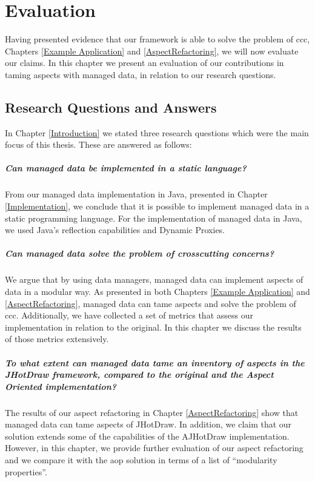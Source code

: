 
\chapter{Evaluation}\label{Evaluation}

Having presented evidence that our framework is able to solve the problem of \ac{ccc}, Chapters \ref{Example Application} and \ref{AspectRefactoring}, we will now evaluate our claims.
In this chapter we present an evaluation of our contributions in taming aspects with managed data, in relation to our research questions.

\section{Research Questions and Answers}\label{Research Questions and Answers}
In Chapter \ref{Introduction} we stated three research questions which were the main focus of this thesis.
These are answered as follows:

\paragraph{Can managed data be implemented in a static language?}
From our managed data implementation in Java, presented in Chapter \ref{Implementation}, we conclude that it is possible to implement managed data in a static programming language.
For the implementation of managed data in Java, we used Java's reflection capabilities and Dynamic Proxies.

\paragraph{Can managed data solve the problem of crosscutting concerns?}
We argue that by using data managers, managed data can implement aspects of data in a modular way.
As presented in both Chapters \ref{Example Application} and \ref{AspectRefactoring}, managed data can tame aspects and solve the problem of \acrlong{ccc}.
Additionally, we have collected a set of metrics that assess our implementation in relation to the original.
In this chapter we discuss the results of those metrics extensively.

\paragraph{To what extent can managed data tame an inventory of aspects in the JHotDraw framework, compared to the original and the Aspect Oriented implementation?}
The results of our aspect refactoring in Chapter \ref{AspectRefactoring} show that managed data can tame aspects of JHotDraw. 
In addition, we claim that our solution extends some of the capabilities of the AJHotDraw implementation.
However, in this chapter, we provide further evaluation of our aspect refactoring and we compare it with the \acrlong{aop} solution in terms of a list of ``modularity properties''.

